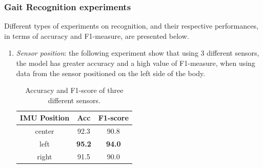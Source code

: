 \subsubsection{Gait Recognition experiments}
Different types of experiments on recognition, and their respective performances, in terms of accuracy and F1-measure, are presented below.
\begin{enumerate}
    \item \emph{Sensor position}: the following experiment show that using 3 different 
    sensors, the model has greater accuracy and a high value of F1-measure, 
    when using data from the sensor positioned on the left side of the body.
    \begin{table}[h!]
        \centering
        \begin{adjustbox}{max width=\textwidth}
        \begin{tabular}{*{3}{|c}|}%
            \hline
            IMU Position & Acc & F1-score \\
            \hline
            center & 92.3 & 90.8\\
            left & \bfseries{95.2} & \bfseries{94.0}\\
            right & 91.5 & 90.0\\
            \hline
        \end{tabular}
        \end{adjustbox}
        \caption{Accuracy and F1-score of three different sensors.}
        \label{table accuracy and F1}
    \end{table}


\end{enumerate}
